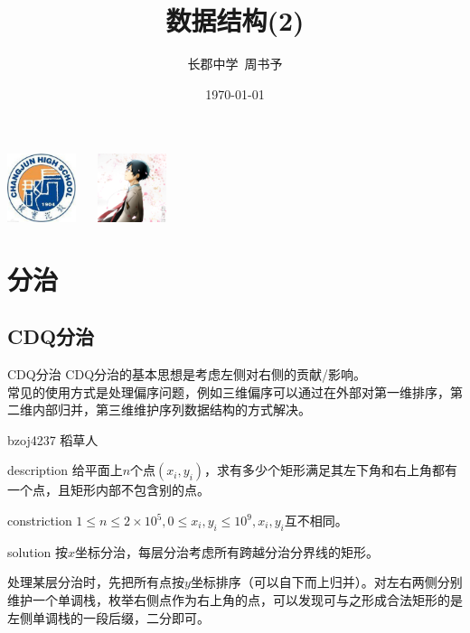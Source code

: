 \documentclass{beamer}
\title{数据结构(2)}
\author{长郡中学\ 周书予}
\date{\today}
\begin{document}
\small
	
	\begin{frame}
	\titlepage
		\begin{center}
		\includegraphics[width=2.0cm]{cj.jpg}
		$\ \ \ \ \ $
		\includegraphics[width=2.0cm]{zsy.png}
		\end{center}
	\end{frame}
	\section{分治}
	\subsection{CDQ分治}
	\begin{frame}{CDQ分治}
		CDQ分治的基本思想是考虑左侧对右侧的贡献/影响。\\
		
		常见的使用方式是处理偏序问题，例如三维偏序可以通过在外部对第一维排序，第二维内部归并，第三维维护序列数据结构的方式解决。
	\end{frame}
	\begin{frame}{bzoj4237 稻草人}
		\begin{block}{description}
			给平面上$n$个点$(x_i,y_i)$，求有多少个矩形满足其左下角和右上角都有一个点，且矩形内部不包含别的点。
		\end{block}
		\begin{block}{constriction}
			$1 \le n \le 2\times 10^5, 0 \le x_i, y_i \le 10^9, x_i, y_i$互不相同。
		\end{block}
		\pause
		\begin{block}{solution}
			按$x$坐标分治，每层分治考虑所有跨越分治分界线的矩形。
			
			处理某层分治时，先把所有点按$y$坐标排序（可以自下而上归并）。对左右两侧分别维护一个单调栈，枚举右侧点作为右上角的点，可以发现可与之形成合法矩形的是左侧单调栈的一段后缀，二分即可。
		\end{block}
		
	\end{frame}
\end{document}
